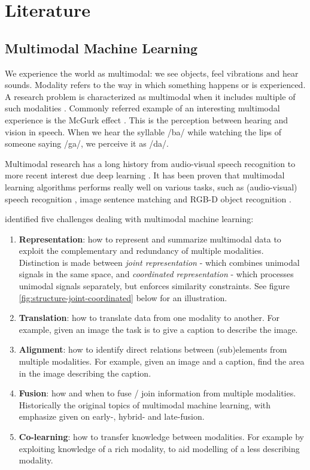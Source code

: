 \clearpage
\section{Literature}

\subsection{Multimodal Machine Learning}

We experience the world as multimodal: we see objects, feel vibrations and hear sounds. Modality refers to the way in which something happens or is experienced. A research problem is characterized as multimodal when it includes multiple of such modalities \cite{Baltrusaitis2017}. Commonly referred example of an interesting multimodal experience is the McGurk effect \cite{McGurk1976}. This is the perception between hearing and vision in speech. When we hear the syllable /ba/ while watching the lips of someone saying /ga/, we perceive it as /da/. 

Multimodal research has a long history from audio-visual speech recognition to more recent interest due deep learning \cite{Ngiam2011}. It has been proven that multimodal learning algorithms performs really well on various tasks, such as (audio-visual) speech recognition \cite{Noda2014}, image sentence matching \cite{Ma2015} and RGB-D object recognition \cite{Eitel2015,Xu2017,Sindagi2019}.

 identified five challenges dealing with multimodal machine learning:
\begin{enumerate}
\item \textbf{Representation}: how to represent and summarize multimodal data to exploit the complementary and redundancy of multiple modalities. Distinction is made between \textit{joint representation} - which combines unimodal signals in the same space, and \textit{coordinated representation} - which processes unimodal signals separately, but enforces similarity constraints. See figure \ref{fig:structure-joint-coordinated} below for an illustration.
\item \textbf{Translation}: how to translate data from one modality to another. For example, given an image the task is to give a caption to describe the image.
\item \textbf{Alignment}: how to identify direct relations between (sub)elements from multiple modalities. For example, given an image and a caption, find the area in the image describing the caption.
\item \textbf{Fusion}: how and when to fuse / join information from multiple modalities. Historically the original topics of multimodal machine learning, with emphasize given on early-, hybrid- and late-fusion.
\item \textbf{Co-learning}: how to transfer knowledge between modalities. For example by exploiting knowledge of a rich modality, to aid modelling of a less describing modality.
\end{enumerate}

